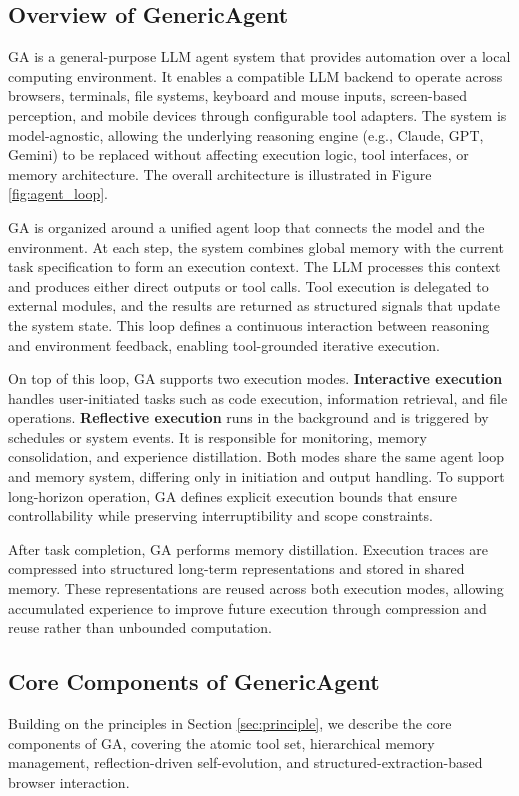 \subsection{Overview of GenericAgent}
\label{sec:overview}
GA is a general-purpose LLM agent system that provides automation over a local computing environment. It enables a compatible LLM backend to operate across browsers, terminals, file systems, keyboard and mouse inputs, screen-based perception, and mobile devices through configurable tool adapters. The system is model-agnostic, allowing the underlying reasoning engine (e.g., Claude, GPT, Gemini) to be replaced without affecting execution logic, tool interfaces, or memory architecture. The overall architecture is illustrated in Figure \ref{fig:agent_loop}.

GA is organized around a unified agent loop that connects the model and the environment. At each step, the system combines global memory with the current task specification to form an execution context. The LLM processes this context and produces either direct outputs or tool calls. Tool execution is delegated to external modules, and the results are returned as structured signals that update the system state. This loop defines a continuous interaction between reasoning and environment feedback, enabling tool-grounded iterative execution.

On top of this loop, GA supports two execution modes. \textbf{Interactive execution} handles user-initiated tasks such as code execution, information retrieval, and file operations. \textbf{Reflective execution} runs in the background and is triggered by schedules or system events. It is responsible for monitoring, memory consolidation, and experience distillation. Both modes share the same agent loop and memory system, differing only in initiation and output handling. To support long-horizon operation, GA defines explicit execution bounds that ensure controllability while preserving interruptibility and scope constraints.

After task completion, GA performs memory distillation. Execution traces are compressed into structured long-term representations and stored in shared memory. These representations are reused across both execution modes, allowing accumulated experience to improve future execution through compression and reuse rather than unbounded computation.

\subsection{Core Components of GenericAgent}
\label{sec:core_design}
Building on the principles in Section \ref{sec:principle}, we describe the core components of GA, covering the atomic tool set, hierarchical memory management, reflection-driven self-evolution, and structured-extraction-based browser interaction.

